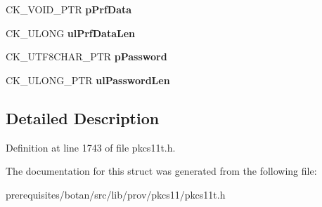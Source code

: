 \begin{DoxyCompactItemize}
C\+K\+\_\+\+V\+O\+I\+D\+\_\+\+P\+TR {\bfseries p\+Prf\+Data}
\item 
\mbox{\label{struct_c_k___p_k_c_s5___p_b_k_d2___p_a_r_a_m_s_a5e835d20bdcc45dd218753b40aec7d6b}} 
C\+K\+\_\+\+U\+L\+O\+NG {\bfseries ul\+Prf\+Data\+Len}
\item 
\mbox{\label{struct_c_k___p_k_c_s5___p_b_k_d2___p_a_r_a_m_s_a19326715c9a2b4896529cae3ca5cdd12}} 
C\+K\+\_\+\+U\+T\+F8\+C\+H\+A\+R\+\_\+\+P\+TR {\bfseries p\+Password}
\item 
\mbox{\label{struct_c_k___p_k_c_s5___p_b_k_d2___p_a_r_a_m_s_a26b94cdd7ed68afb00f08a32eaf1ec18}} 
C\+K\+\_\+\+U\+L\+O\+N\+G\+\_\+\+P\+TR {\bfseries ul\+Password\+Len}
\end{DoxyCompactItemize}


\subsection{Detailed Description}


Definition at line 1743 of file pkcs11t.\+h.



The documentation for this struct was generated from the following file\+:\begin{DoxyCompactItemize}
\item 
prerequisites/botan/src/lib/prov/pkcs11/pkcs11t.\+h\end{DoxyCompactItemize}
